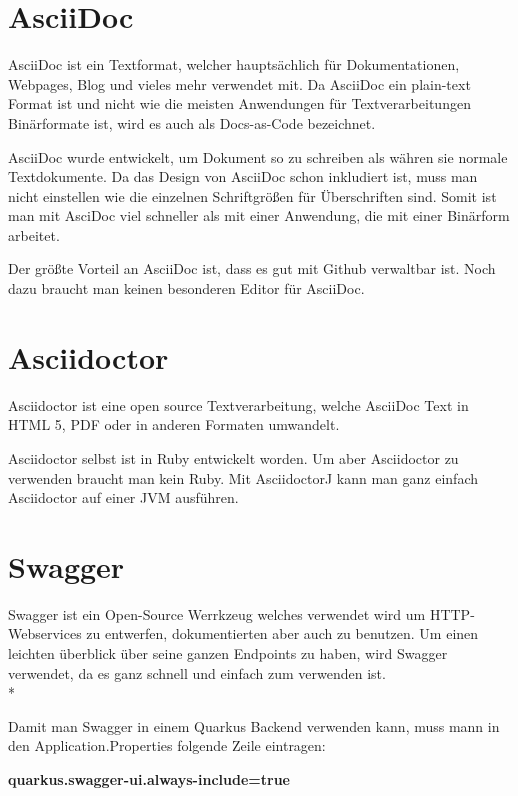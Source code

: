 \section{AsciiDoc}
\author{David Ignjatovic}

AsciiDoc ist ein Textformat, welcher hauptsächlich für Dokumentationen, Webpages, Blog und vieles mehr verwendet mit.
Da AsciiDoc ein plain-text Format ist und nicht wie die meisten Anwendungen für Textverarbeitungen Binärformate ist, wird es auch als Docs-as-Code bezeichnet.

AsciiDoc wurde entwickelt, um Dokument so zu schreiben als währen sie normale Textdokumente. Da das Design von AsciiDoc schon inkludiert ist,
muss man nicht einstellen wie die einzelnen Schriftgrößen für Überschriften sind. Somit ist man mit AsciDoc viel schneller als mit einer Anwendung,
die mit einer Binärform arbeitet.

Der größte Vorteil an AsciiDoc ist, dass es gut mit Github verwaltbar ist. Noch dazu braucht man keinen besonderen Editor für AsciiDoc. 

\section{Asciidoctor}
\author{David Ignjatovic}

Asciidoctor ist eine open source Textverarbeitung, welche AsciiDoc Text in HTML 5, PDF oder in anderen Formaten umwandelt.

Asciidoctor selbst ist in Ruby entwickelt worden. Um aber Asciidoctor zu verwenden braucht man kein Ruby. Mit AsciidoctorJ
kann man ganz einfach Asciidoctor auf einer JVM ausführen.

\pagebreak

\section{Swagger}
\author{David Ignjatovic} 

Swagger ist ein Open-Source Werrkzeug welches verwendet wird um HTTP-Webservices zu entwerfen, dokumentierten aber auch zu benutzen. Um einen leichten überblick über seine 
ganzen Endpoints zu haben, wird Swagger verwendet, da es ganz schnell und einfach zum verwenden ist. \\*

Damit man Swagger in einem Quarkus Backend verwenden kann, muss mann in den Application.Properties folgende Zeile eintragen:

\textbf{quarkus.swagger-ui.always-include=true}

